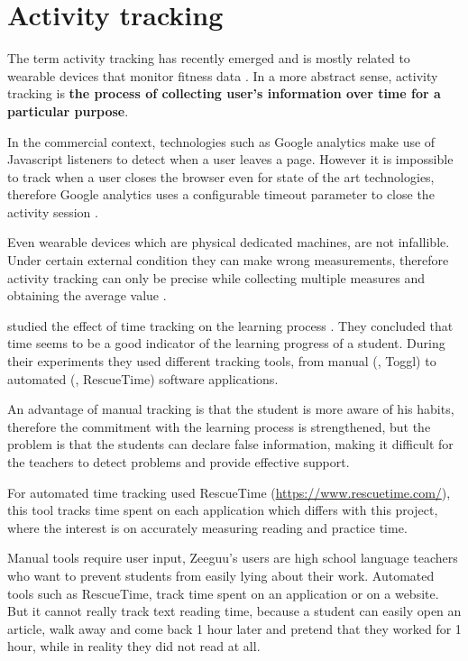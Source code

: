 \section{Activity tracking}

The term activity tracking has recently emerged and is mostly related to wearable devices that monitor fitness data \cite{Wikipedia2016}. In a more abstract sense, activity tracking is \textbf{the process of collecting user's information over time for a particular purpose}. 

In the commercial context, technologies such as Google analytics make use of Javascript listeners to detect when a user leaves a page. However it is impossible to track when a user closes the browser even for state of the art technologies, therefore Google analytics uses a configurable timeout parameter to close the activity session \cite{Pierstorff2014}.

Even wearable devices \cite{Evenson2015} which are physical dedicated machines, are not infallible. Under certain external condition they can make wrong measurements, therefore activity tracking can only be precise while collecting multiple measures and obtaining the average value \cite{El-Amrawy2015}.

\citeauthor{Santos2012} studied the effect of time tracking on the learning process \cite{Santos2012}. They concluded that time seems to be a good indicator of the learning progress of a student. During their experiments they used different tracking tools, from manual (\eg, Toggl) to automated (\eg, RescueTime) software applications. 

An advantage of manual tracking is that the student is more aware of his habits, therefore the commitment with the learning process is strengthened, but the problem is that the students can declare false information, making it difficult for the teachers to detect problems and provide effective support. 

For automated time tracking \citeauthor{Santos2012} used RescueTime (\url{https://www.rescuetime.com/}), this tool tracks time spent on each application which differs with this project, where the interest is on accurately measuring reading and practice time. 

Manual tools require user input, Zeeguu's users are high school language teachers who want to prevent students from easily lying about their work. Automated tools such as RescueTime, track time spent on an application or on a website. But it cannot really track text reading time, because a student can easily open an article, walk away and come back 1 hour later and pretend that they worked for 1 hour, while in reality they did not read at all. 

